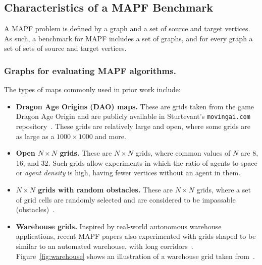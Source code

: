 \documentclass[letterpaper]{article} %
\newcommand{\mapf}{\ac{MAPF}\xspace}
\newcommand{\comment}[1]{{\nb{\textbf{Comment:}}{orange}{#1}}}
\begin{document}
\subsection{Characteristics of a \mapf Benchmark}
A \mapf problem is defined by a graph and a set of source and target vertices. As such, a benchmark for \mapf includes a set of graphs, and for every graph a set of sets of source and target vertices. 
\subsubsection{Graphs for evaluating \mapf algorithms.}
The types of maps commonly used in prior work include:
\begin{itemize}
    \item \textbf{Dragon Age Origins (DAO) maps.} These are grids taken from the game Dragon Age Origin and are publicly available in Sturtevant's \texttt{movingai.com}  repository~\cite{sturtevant2012benchmarks}. 
    These grids are relatively large and open, where some grids are as large as a $1000\times 1000$ and more. 
    
    \item \textbf{Open $N\times N$ grids.} These are $N\times N$ grids, where common values of $N$ are 8, 16, and 32. Such grids allow experiments in which the ratio of agents to space or \emph{agent density} is high, having fewer vertices without an agent in them. 
    
    \item \textbf{$N\times N$ grids with random obstacles.} These are  $N\times N$ grids, where a set of grid cells are randomly  selected and are considered to be impassable (obstacles)~\cite{standley2010finding}. 
    
    \item \textbf{Warehouse grids.} Inspired by real-world autonomous warehouse applications, recent \mapf papers also experimented with grids shaped to be similar to an automated warehouse, with long corridors~\cite{MaAAMAS17,cohen2018anytime}. Figure~\ref{fig:warehouse} shows an illustration of a warehouse grid taken from~\cite{cohen2018anytime}.
\end{itemize}
\end{document}
